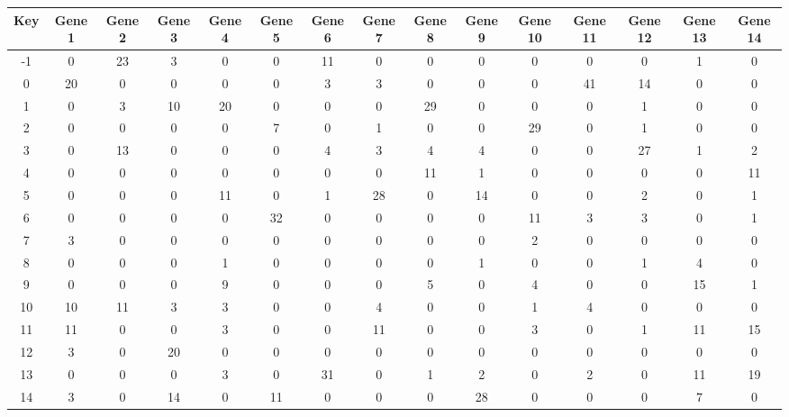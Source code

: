 \begin{tabular}{|c|c|c|c|c|c|c|c|c|c|c|c|c|c|c|}
\hline
Key & Gene 1 & Gene 2 & Gene 3 & Gene 4 & Gene 5 & Gene 6 & Gene 7 & Gene 8 & Gene 9 & Gene 10 & Gene 11 & Gene 12 & Gene 13 & Gene 14 \\
\hline
-1 & 0 & 23 & 3 & 0 & 0 & 11 & 0 & 0 & 0 & 0 & 0 & 0 & 1 & 0 \\
0 & 20 & 0 & 0 & 0 & 0 & 3 & 3 & 0 & 0 & 0 & 41 & 14 & 0 & 0 \\
1 & 0 & 3 & 10 & 20 & 0 & 0 & 0 & 29 & 0 & 0 & 0 & 1 & 0 & 0 \\
2 & 0 & 0 & 0 & 0 & 7 & 0 & 1 & 0 & 0 & 29 & 0 & 1 & 0 & 0 \\
3 & 0 & 13 & 0 & 0 & 0 & 4 & 3 & 4 & 4 & 0 & 0 & 27 & 1 & 2 \\
4 & 0 & 0 & 0 & 0 & 0 & 0 & 0 & 11 & 1 & 0 & 0 & 0 & 0 & 11 \\
5 & 0 & 0 & 0 & 11 & 0 & 1 & 28 & 0 & 14 & 0 & 0 & 2 & 0 & 1 \\
6 & 0 & 0 & 0 & 0 & 32 & 0 & 0 & 0 & 0 & 11 & 3 & 3 & 0 & 1 \\
7 & 3 & 0 & 0 & 0 & 0 & 0 & 0 & 0 & 0 & 2 & 0 & 0 & 0 & 0 \\
8 & 0 & 0 & 0 & 1 & 0 & 0 & 0 & 0 & 1 & 0 & 0 & 1 & 4 & 0 \\
9 & 0 & 0 & 0 & 9 & 0 & 0 & 0 & 5 & 0 & 4 & 0 & 0 & 15 & 1 \\
10 & 10 & 11 & 3 & 3 & 0 & 0 & 4 & 0 & 0 & 1 & 4 & 0 & 0 & 0 \\
11 & 11 & 0 & 0 & 3 & 0 & 0 & 11 & 0 & 0 & 3 & 0 & 1 & 11 & 15 \\
12 & 3 & 0 & 20 & 0 & 0 & 0 & 0 & 0 & 0 & 0 & 0 & 0 & 0 & 0 \\
13 & 0 & 0 & 0 & 3 & 0 & 31 & 0 & 1 & 2 & 0 & 2 & 0 & 11 & 19 \\
14 & 3 & 0 & 14 & 0 & 11 & 0 & 0 & 0 & 28 & 0 & 0 & 0 & 7 & 0 \\
\hline
\end{tabular}